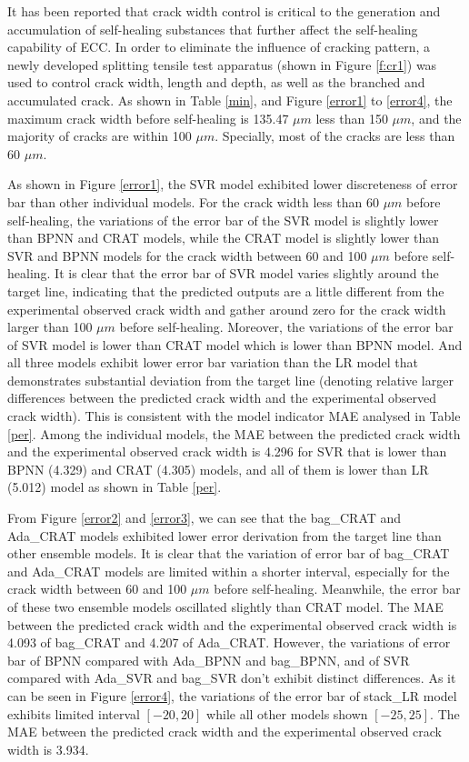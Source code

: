 \documentclass[11pt]{article}
\begin{document}
	It has been reported that crack width control is critical to the generation and accumulation of self-healing substances \cite{vidal2004analyzing,wang1997permeability,reinhardt2003permeability,edvardsen1999water,qiu2016coupled} that further affect the self-healing capability of ECC. In order to eliminate the influence of cracking pattern, a newly developed splitting tensile test apparatus (shown in Figure \ref{f:cr1}) was used to control crack width, length and depth, as well as the branched and accumulated crack. As shown in Table \ref{min}, and Figure \ref{error1} to \ref{error4}, the maximum crack width before self-healing is 135.47 $\mu m$ less than 150 $\mu m$, and the majority of cracks are within 100 $\mu m$. Specially, most of the cracks are less than 60 $\mu m$. 

    As shown in Figure \ref{error1}, the SVR model exhibited lower discreteness of error bar than other individual models. For the crack width less than 60 $\mu m$ before self-healing, the variations of the error bar of the SVR model is slightly lower than BPNN and CRAT models, while the CRAT model is slightly lower than SVR and BPNN models for the crack width between 60 and 100 $\mu m$ before self-healing. It is clear that the error bar of SVR model varies slightly around the target line, indicating that the predicted outputs are a little different from the experimental observed crack width and gather around zero for the crack width larger than 100 $\mu m$ before self-healing. Moreover, the variations of the error bar of SVR model is lower than CRAT model which is lower than BPNN model. And all three models exhibit lower error bar variation than the LR model that demonstrates substantial deviation from the target line (denoting relative larger differences between the predicted crack width and the experimental observed crack width). This is consistent with the model indicator MAE analysed in Table \ref{per}. Among the individual models, the MAE between the predicted crack width and the experimental observed crack width is 4.296 for SVR that is lower than BPNN (4.329) and CRAT (4.305) models, and all of them is lower than LR (5.012) model as shown in Table \ref{per}.
    
    	

	
    From Figure \ref{error2} and \ref{error3}, we can see that the bag\_CRAT and Ada\_CRAT models exhibited lower error derivation from the target line than other ensemble models. It is clear that the variation of error bar of bag\_CRAT and Ada\_CRAT models are limited within a shorter interval, especially for the crack width between 60 and 100 $\mu m$ before self-healing. Meanwhile, the error bar of these two ensemble models oscillated slightly than CRAT model. The MAE between the predicted crack width and the experimental observed crack width is 4.093 of bag\_CRAT and 4.207 of Ada\_CRAT. However, the variations of error bar of BPNN compared with Ada\_BPNN and bag\_BPNN, and of SVR compared with Ada\_SVR and bag\_SVR don't exhibit distinct differences. As it can be seen in Figure \ref{error4}, the variations of the error bar of stack\_LR model exhibits limited interval $[-20,20]$ while all other models shown $[-25,25]$. The MAE between the predicted crack width and the experimental observed crack width is 3.934. 
    
\end{document}
